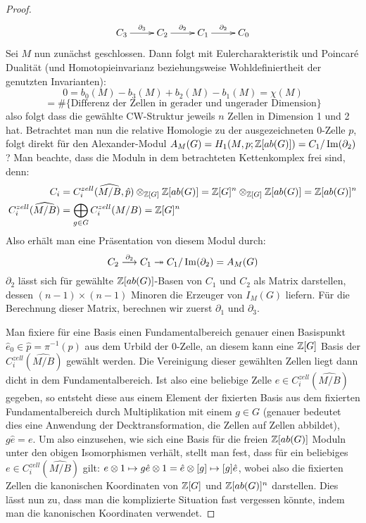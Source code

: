 \begin{proof}
	\[
		\begin{xy}
		\xymatrix{C_3 \ar[r]^{\partial_3}  &C_2 \ar[r]^{\partial_2}  &C_1 \ar[r]^{\partial_2} &C_0 }
		\end{xy}
	\]
	Sei $M$ nun zunächst geschlossen. Dann folgt mit Eulercharakteristik und Poincaré Dualität (und Homotopieinvarianz beziehungsweise Wohldefiniertheit der genutzten Invarianten):
	\[
		0=b_0(M)-b_3(M)+b_2(M)-b_1(M) = \chi(M) 
	\]
	\[
		= \#\{\text{Differenz der Zellen in gerader und ungerader Dimension}\}
	\]
	also folgt dass die gewählte CW-Struktur jeweils $n$ Zellen in Dimension 1 und 2 hat. Betrachtet man nun die relative Homologie zu der ausgezeichneten $0$-Zelle $p$, folgt direkt für den Alexander-Modul $A_M(G)= H_1(M,p;\mathbb{Z}[ab(G)])=C_1/\operatorname{Im}(\partial _2)$? Man beachte, dass die Moduln in dem betrachteten Kettenkomplex frei sind, denn: 
	\begin{align*}
		C_i &=C_i^{zell}(\widehat{M/B},\hat p)\otimes_{\mathbb{Z}[G]}\mathbb{Z}[ab(G)] = \mathbb{Z}[G]^n \otimes_{\mathbb{Z}[G]} \mathbb{Z}[ab(G)] = \mathbb{Z}[ab(G)]^n\\
		C_i^{zell}(\widehat{M/B}) &= \bigoplus_{g \in G} C_i^{zell}(M/B) = \mathbb{Z}[G]^n
	\end{align*}
	Also erhält man eine Präsentation von diesem Modul durch:
	\[
		C_2 \stackrel {\partial_2} \longrightarrow C_1 \twoheadrightarrow C_1/\operatorname{Im}(\partial_2) = A_M(G)
	\]
	$\partial_2$ lässt sich für gewählte $\mathbb{Z}[ab(G)]$-Basen von $C_1$ und $C_2$ als Matrix darstellen, dessen $(n-1)\times (n-1)$ Minoren die Erzeuger von $I_M(G)$ liefern. Für die Berechnung dieser Matrix, berechnen wir zuerst $\partial_1$ und $\partial_3$.

	Man fixiere für eine Basis einen Fundamentalbereich genauer einen Basispunkt $\hat e_0 \in \hat p = \pi^{-1}(p)$ aus dem Urbild der 0-Zelle, an diesem kann eine $\mathbb{Z}[G]$ Basis der $C_i^{zell}(\widehat{ M/B})$ gewählt werden. Die Vereinigung dieser gewählten Zellen liegt dann dicht in dem Fundamentalbereich. Ist also eine beliebige Zelle $e \in C_i^{zell}(\widehat{ M/B})$ gegeben, so entsteht diese aus einem Element der fixierten Basis aus dem fixierten Fundamentalbereich durch Multiplikation mit einem $g\in G$ (genauer bedeutet dies eine Anwendung der Decktransformation, die Zellen auf Zellen abbildet), $g\hat e = e$. Um also einzusehen, wie sich eine Basis für die freien $\mathbb{Z}[ab(G)]$ Moduln unter den obigen Isomorphismen verhält, stellt man fest, dass für ein beliebiges $e\in C_i^{zell}(\widehat{ M/B})$ gilt: $e\otimes 1 \mapsto g\hat e \otimes 1 = \hat e \otimes [g] \mapsto [g]\hat e $, wobei also die fixierten Zellen die kanonischen Koordinaten von $\mathbb{Z}[G]$ und $\mathbb{Z}[ab(G)]^n$ darstellen. Dies lässt nun zu, dass man die komplizierte Situation fast vergessen könnte, indem man die kanonischen Koordinaten verwendet. 


\end{proof}
